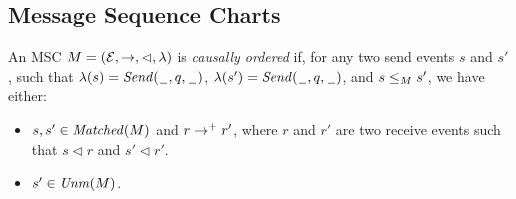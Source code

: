 \documentclass{article}
\begin{document}
\subsection{Message Sequence Charts}


\begin{definition}\label{def:co_msc}
	An MSC $M = (\mathcal{E},\to,\lhd,\lambda)$ is \emph{causally ordered} if, for any two send events $s$ and $s'$, such that $\lambda(s)={\mathit{Send}(\hspace{0.1em}\underline{\hspace{0.5em}}\hspace{0.1em},q,\hspace{0.1em}\underline{\hspace{0.5em}}\hspace{0.1em})}$, $\lambda(s')={\mathit{Send}(\hspace{0.1em}\underline{\hspace{0.5em}}\hspace{0.1em},q,\hspace{0.1em}\underline{\hspace{0.5em}}\hspace{0.1em})}$, and $s \le_M s'$, we have either:
	\begin{itemize}\itemsep=0.5ex
		\item $s,s' \in \mathit{Matched}(M)$ and $r \to^+ r'$, where $r$ and $r'$ are two receive events such that $s \lhd r$ and $s' \lhd r'$.
		\item $s' \in \mathit{Unm}(M)$.
	\end{itemize}
\end{definition}

\end{document}
